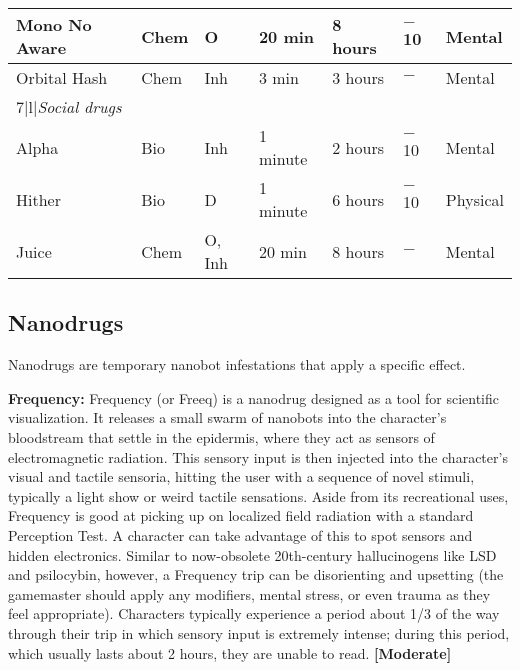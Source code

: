 \begin{table}
\begin{tabularx}{\hline}{|X|l|l|l|l|X|X|}
Mono No Aware	&Chem	&O	&20 min	&8 hours	&$-$10	&Mental	\\ \hline

Orbital Hash	&Chem	&Inh	&3 min	&3 hours	&$-$	&Mental	\\ \hline

\hline{7}{|l|}{\emph{Social drugs}}	\\ \hline

Alpha	&Bio	&Inh	&1 minute	&2 hours	&$-$10	&Mental	\\ \hline

Hither	&Bio	&D	&1 minute	&6 hours	&$-$10	&Physical	\\ \hline

Juice	&Chem	&O, Inh	&20 min	&8 hours	&$-$	&Mental	\\ \hline

\end{tabularx} \end{table} 

\clearpage



\label{tab:drugs} 



\subsection{Nanodrugs} \label{sec:nanodrugs} 

Nanodrugs are temporary nanobot infestations that apply a specific effect. 

\textbf{Frequency:} Frequency (or Freeq) is a nanodrug designed as a tool for scientific visualization. It releases a small swarm of nanobots into the character’s bloodstream that settle in the epidermis, where they act as sensors of electromagnetic radiation. This sensory input is then injected into the character’s visual and tactile sensoria, hitting the user with a sequence of novel stimuli, typically a light show or weird tactile sensations. Aside from its recreational uses, Frequency is good at picking up on localized field radiation with a standard Perception Test. A character can take advantage of this to spot sensors and hidden electronics. Similar to now-obsolete 20th-century hallucinogens like LSD and psilocybin, however, a Frequency trip can be disorienting and upsetting (the gamemaster should apply any modifiers, mental stress, or even trauma as they feel appropriate). Characters typically experience a period about 1/3 of the way through their trip in which sensory input is extremely intense; during this period, which usually lasts about 2 hours, they are unable to read. \textbf{[Moderate]} 

